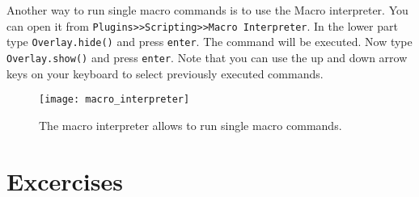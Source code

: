 Another way to run single macro commands is to use the Macro interpreter. You can open it from {\tt Plugins>>Scripting>>Macro Interpreter}. In the lower part type {\tt Overlay.hide()} and press {\tt enter}. The command will be executed. Now type {\tt Overlay.show()} and press {\tt enter}. Note that you can use the up and down arrow keys on your keyboard to select previously executed commands.

\begin{figure}[h!]
  \centering
    \texttt{[image: macro\_interpreter]}
    \caption[The macro interpreter]{The macro interpreter allows to run single macro commands.}
    \label{macro_interpreter}
\end{figure}

\newpage

\section{Excercises}

